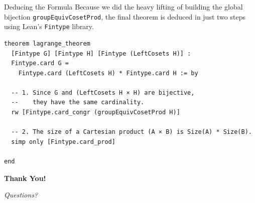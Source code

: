\documentclass{beamer}
\begin{document}
\begin{frame}[fragile]{Deducing the Formula}
    Because we did the heavy lifting of building the global bijection \texttt{groupEquivCosetProd}, the final theorem is deduced in just two steps using Lean's \texttt{Fintype} library.

\begin{lstlisting}
theorem lagrange_theorem 
  [Fintype G] [Fintype H] [Fintype (LeftCosets H)] :
  Fintype.card G = 
    Fintype.card (LeftCosets H) * Fintype.card H := by

  -- 1. Since G and (LeftCosets H × H) are bijective, 
  --    they have the same cardinality.
  rw [Fintype.card_congr (groupEquivCosetProd H)]

  -- 2. The size of a Cartesian product (A × B) is Size(A) * Size(B).
  simp only [Fintype.card_prod]
  
end
\end{lstlisting}
\end{frame}

\begin{frame}
    \begin{center}
        \Huge \textbf{Thank You!}
        
        \vspace{1cm}
        \large \textit{Questions?}
    \end{center}
\end{frame}
\end{document}

